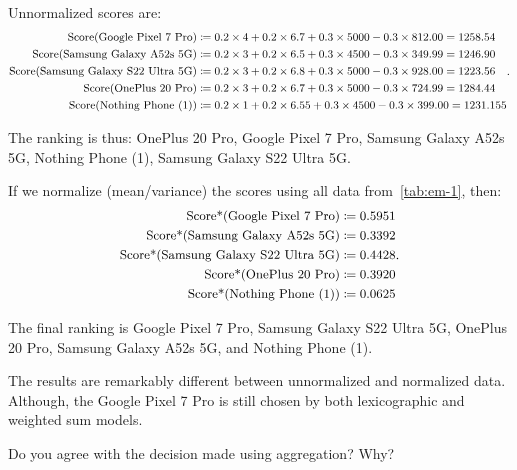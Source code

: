 \documentclass[10pt, UKenglish]{exam}
\begin{document}
\begin{questions}
\begin{solutionorbox}
		Unnormalized scores are:
		\[
			\small
			\begin{aligned}
				\text{Score(Google Pixel 7 Pro)} &\coloneqq 0.2\times 4 + 0.2\times 6.7 + 0.3\times 5000 - 0.3\times 812.00 = 1258.54\\
				\text{Score(Samsung Galaxy A52s 5G)} &\coloneqq 0.2\times 3 + 0.2\times 6.5 + 0.3\times 4500 - 0.3\times 349.99 = 1246.90\\
				\text{Score(Samsung Galaxy S22 Ultra 5G)} &\coloneqq 0.2\times 3 + 0.2\times 6.8 + 0.3\times 5000 - 0.3\times 928.00 = 1223.56\\
				\text{Score(OnePlus 20 Pro)} &\coloneqq 0.2\times 3 + 0.2\times 6.7 + 0.3\times 5000 - 0.3\times 724.99 = 1284.44\\
				\text{Score(Nothing Phone (1))} &\coloneqq 0.2\times 1 + 0.2\times 6.55 + 0.3\times 4500 - 0.3\times 399.00 = 1231.155\\
			\end{aligned}
		.\] 

		The ranking is thus: OnePlus 20 Pro, Google Pixel 7 Pro, Samsung Galaxy A52s 5G, Nothing Phone (1), Samsung Galaxy S22 Ultra 5G.

		If we normalize (mean/variance) the scores using all data from~\cref{tab:em-1}, then:
		\[
			\small
			\begin{aligned}
				\text{Score*(Google Pixel 7 Pro)} &\coloneqq 0.5951\\
				\text{Score*(Samsung Galaxy A52s 5G)} &\coloneqq 0.3392\\
				\text{Score*(Samsung Galaxy S22 Ultra 5G)} &\coloneqq 0.4428\\
				\text{Score*(OnePlus 20 Pro)} &\coloneqq 0.3920\\
				\text{Score*(Nothing Phone (1))} &\coloneqq 0.0625\\ 
			\end{aligned}
		.\] 

		The final ranking is Google Pixel 7 Pro, Samsung Galaxy S22
		Ultra 5G, OnePlus 20 Pro, Samsung Galaxy A52s 5G, and Nothing
		Phone (1).

		The results are remarkably different between unnormalized and
		normalized data. Although, the Google Pixel 7 Pro is still
		chosen by both lexicographic and weighted sum models. 
	\end{solutionorbox}
	
	\question\label{q:5}%
	Do you agree with the decision made using aggregation? Why? 
	
	\begin{parts}

\end{parts}
\end{questions}
\end{document}
